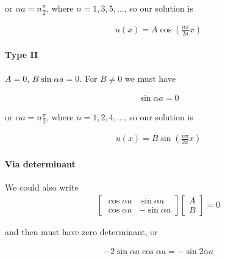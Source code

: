 or $\alpha a = n \frac{\pi}{2}$, where $n = 1, 3, 5, ...$, so our solution is

\begin{equation}\label{eqn:PHY356Lecture9:9}
\begin{aligned}
u(x) = A \cos \left( \frac{n \pi}{2 a} x \right)
\end{aligned}
\end{equation}

\paragraph{Type II}
$A=0$, $B \sin\alpha a = 0$.  For $B \ne 0$ we must have

\begin{equation}\label{eqn:lecture9boundStates:140}
\begin{aligned}
\sin \alpha a = 0
\end{aligned}
\end{equation}

or $\alpha a = n \frac{\pi}{2}$, where $n = 1, 2, 4, ...$, so our solution is

\begin{equation}\label{eqn:PHY356Lecture9:10}
\begin{aligned}
u(x) = B \sin \left( \frac{n \pi}{2 a} x \right)
\end{aligned}
\end{equation}

\paragraph{Via determinant}

We could also write
\begin{equation}\label{eqn:lecture9boundStates:160}
\begin{aligned}
\begin{bmatrix}
\cos \alpha a & \sin\alpha a \\
\cos \alpha a & - \sin\alpha a
\end{bmatrix}
\begin{bmatrix}
A \\
B
\end{bmatrix}
= 0
\end{aligned}
\end{equation}

and then must have zero determinant, or

\begin{equation}\label{eqn:PHY356Lecture9:11}
\begin{aligned}
-2 \sin\alpha a \cos\alpha a = -\sin 2 \alpha a
\end{aligned}
\end{equation}

